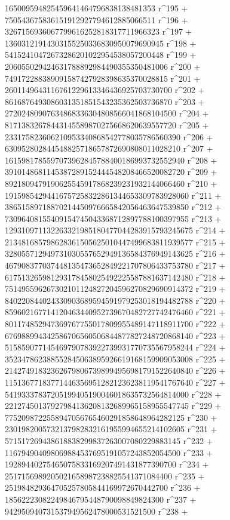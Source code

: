        165009594825459641464796838138481353 r^195 + 
       750543675836151912927794612885066511 r^196 + 
       3267156936067799616252818317711966323 r^197 + 
       13603121914303155250336830950079690945 r^198 + 
       54152410472673286201022954538057200448 r^199 + 
       206055029424631788892984490355350481006 r^200 + 
       749172288389091587427928398635370028815 r^201 + 
       2601149643116761229613346436925703730700 r^202 + 
       8616876493086031351851543235362503736870 r^203 + 
       27202480907634868336304808566041868104500 r^204 + 
       81713832678443145589870275668620639557720 r^205 + 
       233175823606210953340868542778035786560390 r^206 + 
       630952802844548825718657872690808011028210 r^207 + 
       1615981785597073962845788400186993732552940 r^208 + 
       3910148681145387289152444548208466520082720 r^209 + 
       8921809479190625545917868239231932144066460 r^210 + 
       19159854294416757258322861344653309783928060 r^211 + 
       38651589718870214450976665842056463647539850 r^212 + 
       73096408155409154745043368712897788100397955 r^213 + 
       129310971132263321985180477044283915793245675 r^214 + 
       213481685798628361505625010447499683811939577 r^215 + 
       328055712949731030557652949136584376949143625 r^216 + 
       467908377037448135473652849221707806433753780 r^217 + 
       617513265981293178458025492225587881637142480 r^218 + 
       751495596267302101124827204596270829690914372 r^219 + 
       840220844024330903689594591979253018194482788 r^220 + 
       859602167714120463440952739670482727742476460 r^221 + 
       801174852947369767755017809955489147118911700 r^222 + 
       676988994342586706560506844877827248720868140 r^223 + 
       515859077145469790783922739931770735567958244 r^224 + 
       352347862388552845063895926619168159909053008 r^225 + 
       214274918323626798067398994956981791522640840 r^226 + 
       115136771837714463569512821236238119541767640 r^227 + 
       54193337837205199405190046018635732564814000 r^228 + 
       22127450137927984136208132689965158955547745 r^229 + 
       7752098722558947056765460291858648964282125 r^230 + 
       2301982005732137982832161955994655214102605 r^231 + 
       571517269438618838299837263007080229883145 r^232 + 
       116794904098069884537695191057243852054500 r^233 + 
       19289440275465075833169207491431877390700 r^234 + 
       2517156989205021658987238825541371084400 r^235 + 
       251984829364705257805844169972670442700 r^236 + 
       18562223082249846795448790098849824300 r^237 + 
       942950940731537949562478000531521500 r^238 + 
